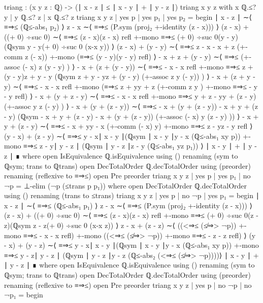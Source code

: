 \documentclass[11pt,a4paper]{article}
\begin{document}
\begin{code}
triang : (x y z : ℚ) -> (∣ x - z ∣ ≤ ∣ x - y ∣ + ∣ y - z ∣)
triang x y z with x ℚ.≤? y | y ℚ.≤? z | x ℚ.≤? z
triang x y z | yes p | yes p₁ | yes p₂ = begin
  ∣ x - z ∣   ∼⟨ ≡⇒≤ (ℚ≤-abs₁ p₂)   ⟩
  z - x ∼⟨ ≡⇒≤ (P.sym (proj₂ +-identity (z - x))) ⟩
  (z - x) + ((+ 0) ÷suc 0) ∼⟨  ≡⇒≤ {(z - x)}{(z - x)} refl
  +-mono ≡⇒≤ {(+ 0) ÷suc 0}{(y - y)}
  (ℚsym {y - y}{(+ 0) ÷suc 0} (x-x {y})) ⟩
  (z - x) + (y - y) ∼⟨ ≡⇒≤ {z - x}{ - x + z} (+-comm z (- x))
  +-mono (≡⇒≤ {(y - y)}{(y - y)} refl)   ⟩
  - x + z + (y - y) ∼⟨ ≡⇒≤ (+-assoc (- x) z (y - y) )   ⟩
  - x + (z + (y - y)) ∼⟨ ≡⇒≤ { - x}{ - x} refl
  +-mono ≡⇒≤ {z + (y - y)}{z + y - y}
  (ℚsym {z + y - y}{z + (y - y)} (+-assoc z y (- y)) )   ⟩
  - x + (z + y - y) ∼⟨ ≡⇒≤ { - x}{ - x} refl +-mono
  (≡⇒≤ {z + y}{y + z} (+-comm z y )
  +-mono ≡⇒≤ { - y}{ - y} refl)   ⟩
  - x + (y + z - y) ∼⟨ ≡⇒≤ { - x}{ - x} refl
  +-mono ≡⇒≤ {y + z - y}{y + (z - y)} (+-assoc y z (- y) )   ⟩
  - x + (y + (z - y)) ∼⟨ ≡⇒≤ { - x + (y + (z - y))}{ - x + y + (z - y)}
  (ℚsym { - x + y + (z - y)}{ - x + (y + (z - y))}
  (+-assoc (- x) y (z - y) ))   ⟩
  - x + y + (z - y) ∼⟨ ≡⇒≤ { - x + y}{y - x}
  (+-comm (- x) y) +-mono ≡⇒≤ {z - y}{z - y} refl  ⟩
  (y - x) + (z - y) ∼⟨  ≡⇒≤ {y - x}{∣ x - y ∣}(ℚsym {∣ x - y ∣}{y - x}
  (ℚ≤-abs₁ {x}{y} p)) +-mono ≡⇒≤ {z - y}{∣ y - z ∣}
  (ℚsym {∣ y - z ∣}{z - y} (ℚ≤-abs₁ {y}{z} p₁))   ⟩
  ∣ x - y ∣ + ∣ y - z ∣ ∎
     where
     open IsEquivalence ℚ.isEquivalence using ()
       renaming (sym to ℚsym; trans to ℚtrans)
     open DecTotalOrder ℚ.decTotalOrder using (preorder)
       renaming (reflexive to ≡⇒≤)
     open Pre preorder
triang x y z | yes p | yes p₁ | no ¬p = ⊥-elim (¬p (≤trans p p₁))
  where
  open DecTotalOrder ℚ.decTotalOrder using ()
      renaming (trans to ≤trans)
triang x y z | yes p | no ¬p | yes p₁ = begin 
  ∣ x - z ∣   ∼⟨ ≡⇒≤ (ℚ≤-abs₁ p₁)   ⟩
  z - x ∼⟨ ≡⇒≤ (P.sym (proj₂ +-identity (z - x))) ⟩
  (z - x) + ((+ 0) ÷suc 0) ∼⟨  ≡⇒≤ {(z - x)}{(z - x)} refl +-mono
  ≡⇒≤ {(+ 0) ÷suc 0}{(z - z)}(ℚsym {z - z}{(+ 0) ÷suc 0} (x-x {z})) ⟩
  z - x + (z - z) ∼⟨ ((<⇒≤ (≰⇒> ¬p)) +-mono ≡⇒≤ { - x}{ - x} refl)
  +-mono ((<⇒≤ (≰⇒> ¬p)) +-mono ≡⇒≤ { - z}{ - z} refl) ⟩
  (y - x) + (y - z) ∼⟨  ≡⇒≤ {y - x}{∣ x - y ∣}(ℚsym {∣ x - y ∣}{y - x}
  (ℚ≤-abs₁ {x}{y} p)) +-mono ≡⇒≤ {y - z}{∣ y - z ∣}
  (ℚsym {∣ y - z ∣}{y - z} (ℚ≤-abs₂ (<⇒≤ (≰⇒> ¬p))))⟩
  ∣ x - y ∣ + ∣ y - z ∣ ∎ 
     where
     open IsEquivalence ℚ.isEquivalence using ()
       renaming (sym to ℚsym; trans to ℚtrans)
     open DecTotalOrder ℚ.decTotalOrder using (preorder)
       renaming (reflexive to ≡⇒≤)
     open Pre preorder
triang x y z | yes p | no ¬p | no ¬p₁ = begin

\end{code}
\end{document}
